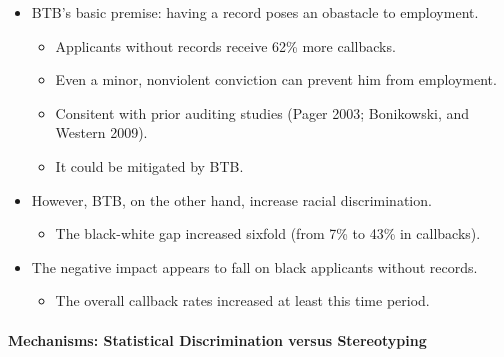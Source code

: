 \documentclass[../root]{subfiles}
\begin{document}
    \begin{itemize}
      \item BTB's basic premise: having a record poses an obastacle to employment.
      \begin{itemize}
        \item Applicants without records receive 62\% more callbacks.
        \item Even a minor, nonviolent conviction can prevent him from employment.
        \item Consitent with prior auditing studies (Pager 2003; Bonikowski, and Western 2009).
        \item It could be mitigated by BTB.
      \end{itemize}
      \item However, BTB, on the other hand, increase racial discrimination.
      \begin{itemize}
        \item The black-white gap increased sixfold (from 7\% to 43\% in callbacks).
      \end{itemize}
      \item The negative impact appears to fall on black applicants without records.
      \begin{itemize}
        \item The overall callback rates increased at least this time period.
      \end{itemize}
    \end{itemize}

    \paragraph{Mechanisms: Statistical Discrimination versus Stereotyping}
\end{document}
